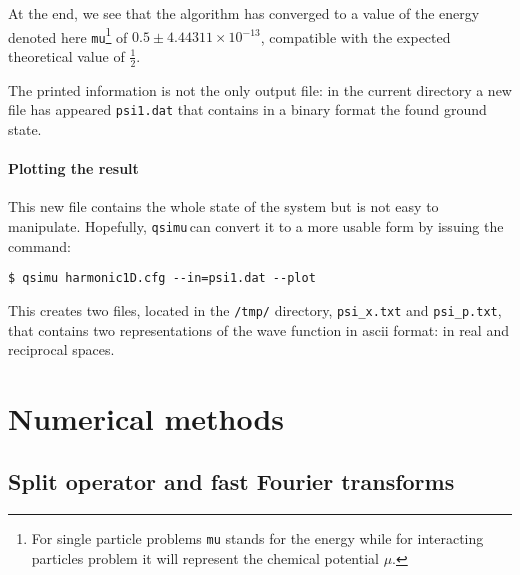 \documentclass[12pt,a4paper]{report}
\newcommand{\qsimu}{\texttt{qsimu}\,}
\begin{document}
At the end, we see that the algorithm has converged to a value of the energy denoted here \texttt{mu}\footnote{For single particle problems \texttt{mu} stands for the energy while for interacting particles problem it will represent the chemical potential $\mu$.} of $0.5\pm4.44311\times10^{-13}$, compatible with the expected theoretical value of $\frac{1}{2}$.

The printed information is not the only output file: in the current directory a new file has appeared \texttt{psi1.dat} that contains in a binary format the found ground state.

\subsubsection{Plotting the result}
This new file contains the whole state of the system but is not easy to manipulate.
Hopefully, \qsimu can convert it to a more usable form by issuing the command:
\begin{verbatim}
$ qsimu harmonic1D.cfg --in=psi1.dat --plot
\end{verbatim}
This creates two files, located in the \texttt{/tmp/} directory, \texttt{psi\_x.txt} and \texttt{psi\_p.txt}, that contains two representations of the wave function in ascii format: in real and reciprocal spaces.

\chapter{Numerical methods}
\section{\label{sec:integrator}Split operator and fast Fourier transforms}
\end{document}
